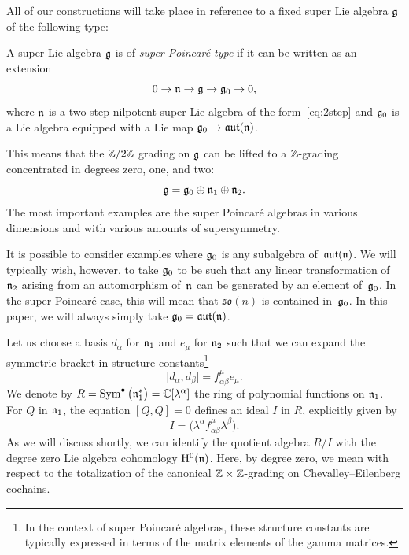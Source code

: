 \documentclass[11pt]{article}
\numberwithin{equation}{section}
\numberwithin{equation}{section}
\def\lie#1{\ensuremath{\mathfrak{#1}}}
\def\aut{\ensuremath{\lie{aut}}}
\def\so{\lie{so}}
\DeclareMathOperator{\Sym}{Sym}
\begin{document}
All of our constructions will take place in reference to a fixed super Lie algebra $\mathfrak g$ of the following type:
\begin{dfn}
	A super Lie algebra $\mathfrak g$ is of \emph{super Poincar\'e type} if it can be written as an extension
	\begin{equation*}
	0 \to \mathfrak n \to \mathfrak g \to \mathfrak g_0 \to 0,
	\end{equation*}
	where $\mathfrak n$ is a two-step nilpotent super Lie algebra of the form~\eqref{eq:2step} and $\mathfrak g_0$ is a Lie algebra equipped with a Lie map $\fg_0 \to \aut(\fn)$.
\end{dfn}

This means that the $\mathbb Z/2\mathbb Z$ grading on $\mathfrak g$ can be lifted to a $\mathbb Z$-grading concentrated in degrees zero, one, and two:
\begin{equation*}
\mathfrak g = \mathfrak g_0 \oplus \mathfrak n_1 \oplus \mathfrak n_2.
\end{equation*}
The most important examples are the super Poincar\'e algebras in various dimensions and with various amounts of supersymmetry.

It is possible to consider examples where $\mathfrak g_0$ is any subalgebra of~$\aut(\fn)$. We will typically wish, however, to take $\mathfrak g_0$ to
be such that any linear transformation of $\mathfrak n_2$ arising from an automorphism of~$\mathfrak n$ can be generated by an element of~$\mathfrak g_0$.
In the super-Poincar\'e case, this will mean that $\so(n)$ is contained in~$\mathfrak g_0$. In this paper, we will always simply take $\fg_0 = \aut(\fn)$.

Let us choose a basis $d_\alpha$ for $\mathfrak n_1$ and $e_\mu$ for $\mathfrak n_2$ such that we can expand the symmetric bracket in structure constants\footnote{In the context of super Poincar\'e algebras, these structure constants are typically expressed in terms of the matrix elements of the gamma matrices.}
\begin{equation*}
\big[d_\alpha , d_\beta \big] = f^\mu_{\alpha \beta} e_\mu .
\end{equation*}
We denote by $R = \Sym^\bullet\big(\fn_1^*\big) = \CC[\lambda^\alpha]$ the ring of polynomial functions on $\mathfrak n_1$. For $Q$ in $\mathfrak n_1$, the equation $[Q,Q] = 0$ defines an ideal $I$ in $R$, explicitly given by
\begin{equation*}
I = \big(\lambda^\alpha f^\mu_{\alpha \beta} \lambda^\beta \big) .
\end{equation*}
As we will discuss shortly, we can identify the quotient algebra $R/I$ with the degree zero Lie algebra cohomology $\mathrm H^0(\mathfrak n)$. Here, by degree zero, we mean with respect to the totalization of the canonical $\mathbb Z \times \mathbb Z$-grading on Chevalley--Eilenberg cochains.
\end{document}
